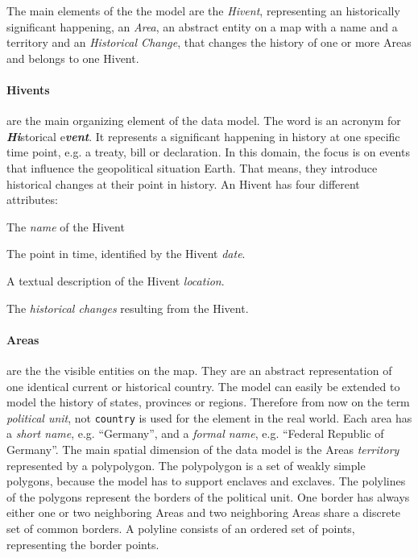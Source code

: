 The main elements of the the model are the \emph{Hivent}, representing an historically significant happening, an \emph{Area}, an abstract entity on a map with a name and a territory and an \emph{Historical Change}, that changes the history of one or more Areas and belongs to one Hivent.

\paragraph{Hivents} %
\label{par:hivent}

are the main organizing element of the data model. The word is an acronym for \emph{\textbf{Hi}}storical e\emph{\textbf{vent}}. It represents a significant happening in history at one specific time point, e.g. a treaty, bill or declaration. In this domain, the focus is on events that influence the geopolitical situation Earth. That means, they introduce historical changes at their point in history. An Hivent has four different attributes:

\begin{compactenum}
  \item The \emph{name} of the Hivent
  \item The point in time, identified by the Hivent \emph{date}.
  \item A textual description of the Hivent \emph{location}.
  \item The \emph{historical changes} resulting from the Hivent.
\end{compactenum}


\paragraph{Areas} %
\label{par:area}

are the the visible entities on the map. They are an abstract representation of one identical current or historical country. The model can easily be extended to model the history of states, provinces or regions. Therefore from now on the term \emph{political unit}, not \texttt{country} is used for the element in the real world. Each area has a \emph{short name}, e.g. ``Germany'', and a \emph{formal name}, e.g. ``Federal Republic of Germany''. The main spatial dimension of the data model is the Areas \emph{territory} represented by a polypolygon. The polypolygon is a set of weakly simple polygons, because the model has to support enclaves and exclaves. The polylines of the polygons represent the borders of the political unit. One border has always either one or two neighboring Areas and two neighboring Areas share a discrete set of common borders. A polyline consists of an ordered set of points, representing the border points.

